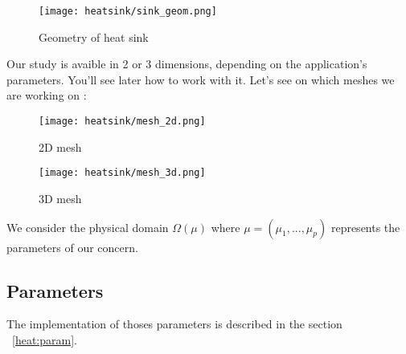 \begin{figure}[!h]
\centering
\texttt{[image: heatsink/sink\_geom.png]}
\caption{Geometry of heat sink}
\end{figure}

Our study is avaible in 2 or 3 dimensions, depending on the application's parameters. You'll see later how to work with it. Let's see on which meshes we are working on :
\begin{figure}[!h]
\begin{minipage}[b]{.50\linewidth}
\centering
\texttt{[image: heatsink/mesh\_2d.png]}
\caption{2D mesh}
\end{minipage}
\begin{minipage}[b]{.50\linewidth}
\centering
\texttt{[image: heatsink/mesh\_3d.png]}
\caption{3D mesh}
\end{minipage}
\end{figure}

We consider the physical domain $\varOmega (\mu)$ where $\mu = (\mu_1, ...,\mu_p)$ represents the parameters of our concern. 

\subsection{Parameters}
The implementation of thoses parameters is described in the section ~\ref{heat:param}.

